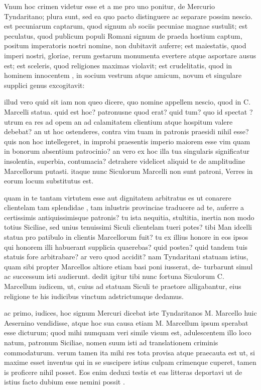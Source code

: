  Vnum hoc crimen videtur esse et a me pro uno ponitur, de Mercurio Tyndaritano; plura sunt, sed ea quo pacto distinguere ac separare possim nescio. est pecuniarum captarum, quod signum ab sociis pecuniae magnae sustulit; est peculatus, quod publicum populi Romani signum de praeda hostium captum, positum imperatoris nostri nomine, non dubitavit auferre; est maiestatis, quod imperi nostri, gloriae, rerum gestarum monumenta evertere atque asportare ausus est; est sceleris, quod religiones maximas violavit; est crudelitatis, quod in hominem innocentem , in socium vestrum atque amicum, novum et singulare supplici genus excogitavit:

 illud vero quid sit iam non queo dicere, quo nomine appellem nescio, quod in C. Marcelli statua. quid est hoc? patronusne quod erat? quid tum? quo id spectat ? utrum ea res ad opem an ad calamitatem clientium atque hospitum valere debebat? an ut hoc ostenderes, contra vim tuam in patronis praesidi nihil esse? quis non hoc intellegeret, in improbi praesentis imperio maiorem esse vim quam in bonorum absentium patrocinio? an vero ex hoc illa tua singularis significatur insolentia, superbia, contumacia? detrahere videlicet aliquid te de amplitudine Marcellorum putasti. itaque nunc Siculorum Marcelli non sunt patroni, Verres in eorum locum substitutus est.

 quam in te tantam virtutem esse aut dignitatem arbitratus es ut conarere clientelam tam splendidae , tam inlustris provinciae traducere ad te, auferre a certissimis antiquissimisque patronis? tu ista nequitia, stultitia, inertia non modo totius Siciliae, sed unius tenuissimi Siculi clientelam tueri potes? tibi Man idcelli statua pro patibulo in clientis Marcellorum fuit? tu ex illius honore in eos ipsos qui honorem illi habuerant supplicia quaerebas? quid postea? quid tandem tuis statuis fore arbitrabare? ar vero quod accidit? nam Tyndaritani statuam istius, quam sibi propter Marcellos altiore etiam basi poni iusserat, de- turbarunt simul ac successum isti audierunt. dedit igitur tibi nunc fortuna Siculorum C. Marcellum iudicem, ut, cuius ad statuam Siculi te praetore alligabantur, eius religione te his iudicibus vinctum adstrictumque dedamus.

 ac primo, iudices, hoc signum Mercuri dicebat iste Tyndaritanos M. Marcello huic Aesernino vendidisse, atque hoc sua causa etiam M. Marcellum ipsum sperabat esse dicturum; quod mihi numquam veri simile visum est, adulescentem illo loco natum, patronum Siciliae, nomen suum isti ad translationem criminis commodaturum. verum tamen ita mihi res tota provisa atque praecauta est ut, si maxime esset inventus qui in se suscipere istius culpam crimenque cuperet, tamen is proficere nihil posset. Eos enim deduxi testis et eas litteras deportavi ut de istius facto dubium esse nemini possit .

